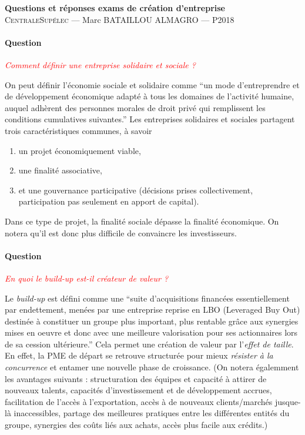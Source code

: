 \documentclass[12pt,oneside,a4paper]{article}
\newcommand{\question}[1]
{
\addtocounter{section}{1}
\paragraph*{Question \thesection}
\emph{\textcolor{red}{#1}}
}
\begin{document}
\begin{center}
{\LARGE \bfseries 
 Questions et réponses exams de création d'entreprise \\[0.3cm] 
}
{\large
  \textsc{CentraleSupélec} --- Marc BATAILLOU ALMAGRO --- P2018\\[0.7cm]
}
\end{center}

\question{Comment définir une entreprise solidaire et sociale ?}
On peut définir l'économie sociale et solidaire comme ``un mode d'entreprendre et de développement
économique adapté à tous les domaines de l'activité humaine, 
auquel adhèrent des personnes morales de droit privé qui remplissent les conditions cumulatives suivantes.''
Les entreprises solidaires et sociales partagent trois caractéristiques communes, à savoir
\begin{enumerate}
  \item un projet économiquement viable,
  \item une finalité associative,
  \item et une gouvernance participative (décisions prises collectivement, participation pas seulement en apport de capital).
\end{enumerate}
Dans ce type de projet, la finalité sociale dépasse la finalité économique.
On notera qu'il est donc plus difficile de convaincre les investisseurs.

\question{En quoi le build-up est-il créateur de valeur ?}
Le \emph{build-up} est défini comme une ``suite d'acquisitions financées essentiellement
par endettement, menées par une entreprise reprise en LBO (Leveraged Buy Out) destinée 
à constituer un groupe plus important, plus rentable grâce aux synergies mises en oeuvre 
et donc avec une meilleure valorisation pour ses actionnaires lors de sa cession ultérieure.''
Cela permet une création de valeur par l'\emph{effet de taille}.
En effet, la PME de départ se retrouve structurée 
pour mieux \emph{résister à la concurrence} et entamer une nouvelle phase de croissance.
(On notera égalemment les avantages suivants : 
structuration des équipes et capacité à attirer de nouveaux talents,
capacités d’investissement et de développement accrues,
facilitation de l’accès à l’exportation, 
accès à de nouveaux clients/marchés jusque-là inaccessibles,
partage des meilleures pratiques entre les différentes entités du groupe,
synergies des coûts liés aux achats, accès plus facile aux crédits.)
\end{document}
